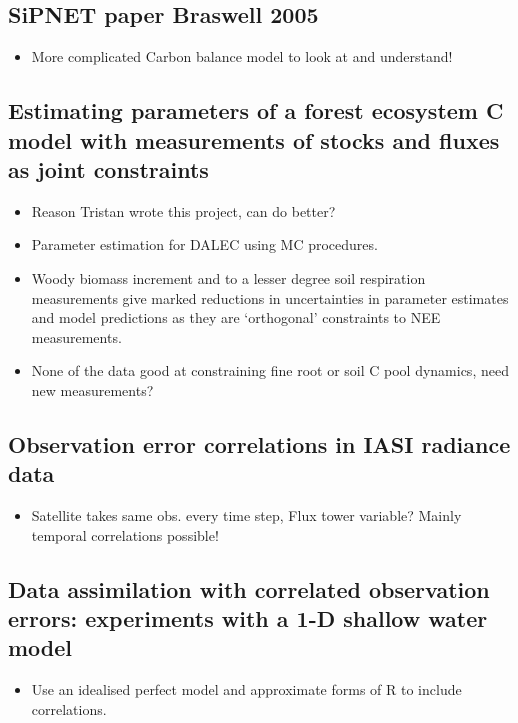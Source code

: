 \documentclass[11pt]{article}
\begin{document}
\subsection*{SiPNET paper Braswell 2005 \cite{braswell2005estimating}}
\begin{itemize}
\item More complicated Carbon balance model to look at and understand!
\end{itemize}


\subsection*{Estimating parameters of a forest ecosystem C model with measurements of stocks and fluxes as joint constraints \cite{richardson2010estimating}}
\begin{itemize}
\item Reason Tristan wrote this project, can do better?
\item Parameter estimation for DALEC using MC procedures.
\item Woody biomass increment and to a lesser degree soil respiration measurements give marked reductions in uncertainties in parameter estimates and model predictions as they are `orthogonal' constraints to NEE measurements.
\item None of the data good at constraining fine root or soil C pool dynamics, need new measurements? 
\end{itemize}


\subsection*{Observation error correlations in IASI radiance data \cite{stewart2009observation}}
\begin{itemize}
\item Satellite takes same obs. every time step, Flux tower variable? Mainly temporal correlations possible!
\end{itemize}


\subsection*{Data assimilation with correlated observation errors: experiments with a 1-D shallow water model \cite{stewart2013data}}
\begin{itemize}
\item Use an idealised perfect model and approximate forms of R to include correlations.
\end{itemize}
\end{document}
